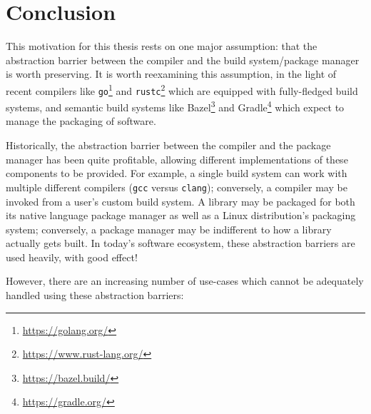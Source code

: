 \chapter{Conclusion}

This motivation for this thesis rests on one major assumption: that the
abstraction barrier between the compiler and the build system/package manager is
worth preserving.  It is worth reexamining this assumption, in the light
of recent compilers like \verb|go|\footnote{\url{https://golang.org/}} and \verb|rustc|\footnote{\url{https://www.rust-lang.org/}} which are equipped
with fully-fledged build systems, and semantic build systems like
Bazel\footnote{\url{https://bazel.build/}} and Gradle\footnote{\url{https://gradle.org/}} which expect to manage the packaging of software.

Historically, the abstraction barrier between the compiler and the
package manager has been quite profitable, allowing different implementations
of these components to be provided. For example, a single build system
can work with multiple different compilers (\verb|gcc| versus \verb|clang|);
conversely, a compiler may be invoked from a user's custom build system.
A library may be packaged for both its native language package manager
as well as a Linux distribution's packaging system; conversely, a
package manager may be indifferent to how a library actually gets built.
In today's software ecosystem, these abstraction barriers are used
heavily, with good effect!

However, there are an increasing number of use-cases which cannot be
adequately handled using these abstraction barriers:

